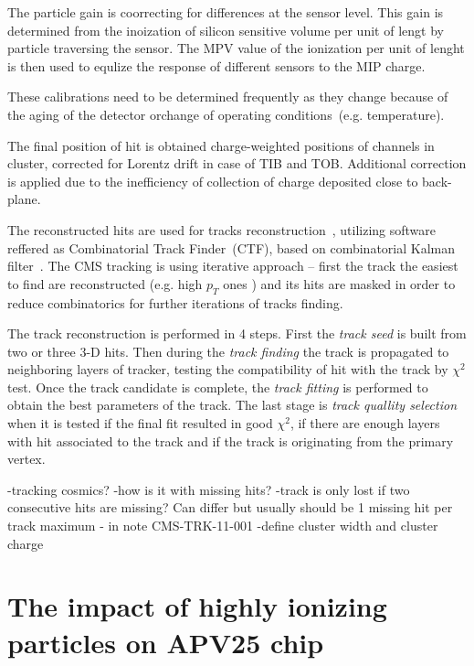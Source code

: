 The particle gain is coorrecting for differences at the sensor level. This gain is determined from the inoization of silicon sensitive volume per unit of lengt by particle traversing the sensor. The MPV value of the ionization per unit of lenght is then used to equlize the response of different sensors to the MIP charge. 

These calibrations need to be determined frequently as they change because of the aging of the detector orchange of operating conditions~(e.g. temperature).

The final position of hit is obtained charge-weighted positions of channels in cluster, corrected for Lorentz drift in case of TIB and TOB. Additional correction is applied due to the inefficiency of collection of charge deposited close to back-plane.

The reconstructed hits are used for tracks reconstruction~\cite{Chatrchyan:2014fea}, utilizing software reffered as Combinatorial Track Finder~(CTF), based on combinatorial Kalman filter~\cite{Fruhwirth:1987fm}. The CMS tracking is using iterative approach -- first the track the easiest to find are reconstructed (e.g. high $p_{T}$ ones ) and its hits are masked in order to reduce combinatorics for further iterations of tracks finding.


The track reconstruction is performed in 4 steps. First the \textit{track seed} is built from two or three 3-D hits. Then during the \textit{track finding} the track is propagated to neighboring layers of tracker, testing the compatibility of hit with the track by $\chi^{2}$ test. Once the track candidate is complete, the \textit{track fitting} is performed to obtain the best parameters of the track. The last stage is \textit{track quallity selection} when it is tested if the final fit resulted in good $\chi^{2}$, if there are enough layers with hit associated to the track and if the track is originating from the primary vertex.

-tracking cosmics?
-how is it with missing hits? -track is only lost if two consecutive hits are missing? Can differ but usually should be 1 missing hit per track maximum -  in note CMS-TRK-11-001
-define cluster width and cluster charge

\section{The impact of highly ionizing particles on APV25 chip}



